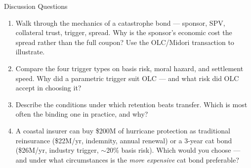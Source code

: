 \documentclass[11pt, aspectratio=169]{beamer}
\begin{document}
\begin{frame}{Discussion Questions}
\begin{enumerate}
  \item Walk through the mechanics of a catastrophe bond --- sponsor, SPV, collateral trust, trigger, spread. Why is the sponsor's economic cost the spread rather than the full coupon? Use the OLC/Midori transaction to illustrate.
  \item Compare the four trigger types on basis risk, moral hazard, and settlement speed. Why did a parametric trigger suit OLC --- and what risk did OLC accept in choosing it?
  \item Describe the conditions under which retention beats transfer. Which is most often the binding one in practice, and why?
  \item A coastal insurer can buy \$200M of hurricane protection as traditional reinsurance (\$22M/yr, indemnity, annual renewal) or a 3-year cat bond (\$26M/yr, industry trigger, $\sim$20\% basis risk). Which would you choose --- and under what circumstances is the \emph{more expensive} cat bond preferable?
\end{enumerate}
\end{frame}
\end{document}
